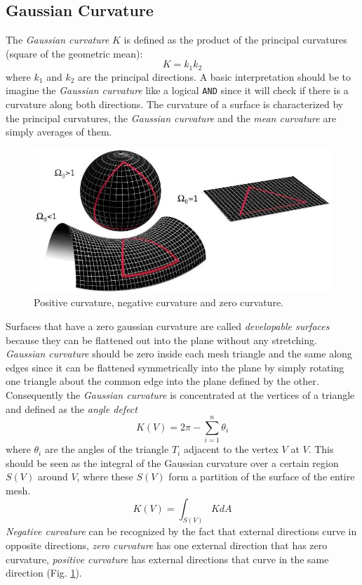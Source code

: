 \subsection{Gaussian Curvature} \label{section:gaussian-curvature-intro}
The \textit{Gaussian curvature} $K$ is defined as the product of the principal curvatures (square of the geometric mean):
$$K=k_1k_2$$
where $k_1$ and $k_2$ are the principal directions. A basic interpretation should be to imagine the \textit{Gaussian curvature} like a logical \texttt{AND} since it will check if there is a curvature along both directions.
The curvature of a surface is characterized by the principal curvatures, the \textit{Gaussian curvature} and the \textit{mean curvature} are simply averages of them.
\cite{WEBSITE:gaussiancurvaturedirty}
\begin{figure}[h]
  \centering
\includegraphics[scale=0.5]{images/gaussian_curvature_examples.png}
\caption{Positive curvature, negative curvature and zero curvature.}\label{fig:curvature-gaussian}
\end{figure}
Surfaces that have a zero gaussian curvature are called \textit{developable surfaces} because they can be flattened out into the plane without any stretching. \textit{Gaussian curvature} should be zero inside each mesh triangle and the same along edges since it can be flattened symmetrically into the plane by simply rotating one triangle about the common edge into the plane defined by the other. Consequently the \textit{Gaussian curvature} is concentrated at the vertices of a triangle and defined as the \textit{angle defect}
$$K(V) = 2 \pi - \sum_{i=1}^n \theta_i$$
where $\theta_i$ are the angles of the triangle $T_i$ adjacent to the vertex $V$ at $V$. This should be seen as the integral of the Gaussian curvature over a certain region $S(V)$ around $V$, where these $S(V)$ form a partition of the surface of the entire mesh.
$$ K(V) = \int_{S(V)} KdA  $$
\textit{Negative curvature} can be recognized by the fact that external directions curve in opposite directions, \textit{zero curvature} has one external direction that has zero curvature, \textit{positive curvature} has external directions that curve in the same direction (Fig. \ref{fig:curvature-gaussian}).
